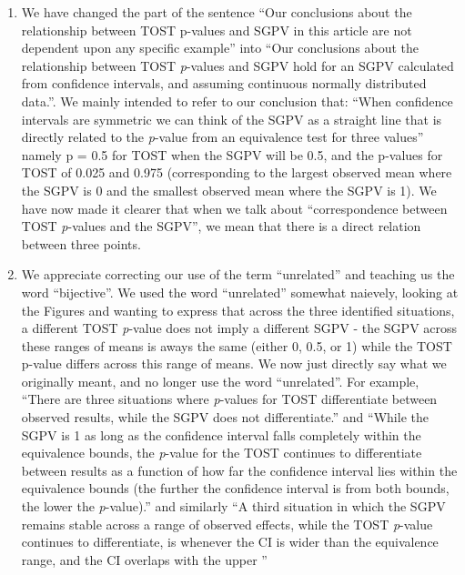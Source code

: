\documentclass[man]{apa6}
\begin{document}
\begin{enumerate}
\def\labelenumi{\arabic{enumi}.}
\item
  We have changed the part of the sentence \enquote{Our conclusions
  about the relationship between TOST p-values and SGPV in this article
  are not dependent upon any specific example} into \enquote{Our
  conclusions about the relationship between TOST \emph{p}-values and
  SGPV hold for an SGPV calculated from confidence intervals, and
  assuming continuous normally distributed data.}. We mainly intended to
  refer to our conclusion that: \enquote{When confidence intervals are
  symmetric we can think of the SGPV as a straight line that is directly
  related to the \emph{p}-value from an equivalence test for three
  values} namely p = 0.5 for TOST when the SGPV will be 0.5, and the
  p-values for TOST of 0.025 and 0.975 (corresponding to the largest
  observed mean where the SGPV is 0 and the smallest observed mean where
  the SGPV is 1). We have now made it clearer that when we talk about
  \enquote{correspondence between TOST \emph{p}-values and the SGPV}, we
  mean that there is a direct relation between three points.
\item
  We appreciate correcting our use of the term \enquote{unrelated} and
  teaching us the word \enquote{bijective}. We used the word
  \enquote{unrelated} somewhat naievely, looking at the Figures and
  wanting to express that across the three identified situations, a
  different TOST \emph{p}-value does not imply a different SGPV - the
  SGPV across these ranges of means is aways the same (either 0, 0.5, or
  1) while the TOST p-value differs across this range of means. We now
  just directly say what we originally meant, and no longer use the word
  \enquote{unrelated}. For example, \enquote{There are three situations
  where \emph{p}-values for TOST differentiate between observed results,
  while the SGPV does not differentiate.} and \enquote{While the SGPV is
  1 as long as the confidence interval falls completely within the
  equivalence bounds, the \emph{p}-value for the TOST continues to
  differentiate between results as a function of how far the confidence
  interval lies within the equivalence bounds (the further the
  confidence interval is from both bounds, the lower the
  \emph{p}-value).} and similarly \enquote{A third situation in which
  the SGPV remains stable across a range of observed effects, while the
  TOST \emph{p}-value continues to differentiate, is whenever the CI is
  wider than the equivalence range, and the CI overlaps with the upper
}
\end{enumerate}
\end{document}
